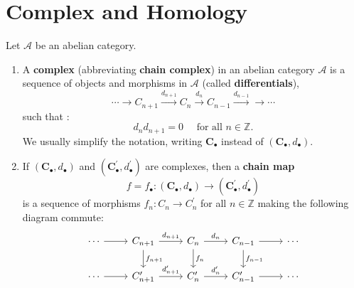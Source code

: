 \documentclass[12pt, oneside]{book}
\begin{document}
\section{Complex and Homology}
\begin{definition}
    Let $\mathcal{A}$ be an abelian category.
    \begin{enumerate}
        \item
              A \textbf{complex} (abbreviating \textbf{chain complex}) in an abelian category $\mathcal{A}$ is a sequence of objects and morphisms in $\mathcal{A}$ (called \textbf{differentials}),
              \begin{equation*}
                  \cdots \rightarrow  C_{n+1}\xrightarrow{d_{n+1}} C_n\xrightarrow{d_n}C_{n-1}\xrightarrow{d_{n-1}} \rightarrow \cdots
              \end{equation*}
              such that :
              \begin{equation*}
                  d_n d_{n+1}=0 \quad \text { for all } n \in \mathbb{Z} .
              \end{equation*}
              We usually simplify the notation, writing $\mathbf{C}_{\bullet}$ instead of $\left(\mathbf{C}_{\bullet}, d_{\bullet}\right)$.
        \item
              If $\left(\mathbf{C}_{\bullet}, d_{\bullet}\right)$ and $\left(\mathbf{C}_{\bullet}^{\prime}, d_{\bullet}^{\prime}\right)$ are complexes, then a \textbf{chain map}
              \begin{equation*}
                  f=f_{\bullet}:\left(\mathbf{C}_{\bullet}, d_{\bullet}\right) \rightarrow\left(\mathbf{C}_{\bullet}^{\prime}, d_{\bullet}^{\prime}\right)
              \end{equation*}
              is a sequence of morphisms $f_n: C_n \rightarrow C_n^{\prime}$ for all $n \in \mathbb{Z}$ making the following diagram commute:
              \begin{equation*}
                  \begin{tikzcd}
                      \cdots \arrow[r] & C_{n+1} \arrow[d,"f_{n+1}"] \arrow[r,"d_{n+1}"] & C_n \arrow[d,"f_n"] \arrow[r,"d_n"] & C_{n-1} \arrow[d,"f_{n-1}"] \arrow[r] & \cdots \\
                      \cdots \arrow[r] & C_{n+1}^{\prime} \arrow[r,"d_{n+1}^{\prime}"] & C_n^{\prime} \arrow[r,"d_n^{\prime}"] & C_{n-1}^{\prime} \arrow[r] & \cdots
                  \end{tikzcd}
              \end{equation*}



\end{enumerate}
\end{definition}
\end{document}
